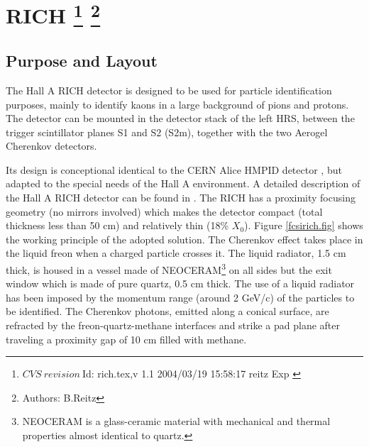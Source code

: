  \chapter[RICH]{RICH
\footnote{
  $CVS~revision~ $Id: rich.tex,v 1.1 2004/03/19 15:58:17 reitz Exp $ $
}
\footnote{Authors: B.Reitz }
}
\label{sec:rich}

\section{Purpose and Layout} 

The Hall A RICH detector is designed to be used for particle identification purposes, mainly 
to identify kaons in a large background of pions and protons. The detector can be mounted in
the detector stack of the left HRS, between the trigger scintillator planes S1 and S2 (S2m),
together with the two Aerogel Cherenkov detectors.

Its design is conceptional identical 
to the CERN Alice HMPID detector \cite{Beole:1998yq}, but adapted to the special needs
of the Hall A environment.
A detailed description of the Hall A RICH detector can be found in \cite{hallarep02}.
The RICH has a proximity focusing geometry (no mirrors involved) which makes the 
detector compact (total thickness less than 50 cm) and relatively thin (18\% $X_0$).
Figure \ref{fcsirich.fig} shows the working principle of the adopted solution.
The Cherenkov effect takes place in the liquid freon 
when a charged particle 
crosses it.
The liquid radiator, 1.5 cm thick, 
is housed in a vessel made of NEOCERAM\footnote{NEOCERAM is
a glass-ceramic material with mechanical and thermal properties
almost identical to quartz.}    
on all sides but
the exit window which is made of pure quartz, 
0.5 cm thick. 
The use of a liquid radiator has been imposed by the momentum range (around
 2 GeV/c) of the particles to be identified.
The Cherenkov photons, emitted along a conical surface,
are refracted by the 
freon-quartz-methane interfaces and strike 
a pad plane after traveling a proximity gap 
of 10 cm filled with methane.


